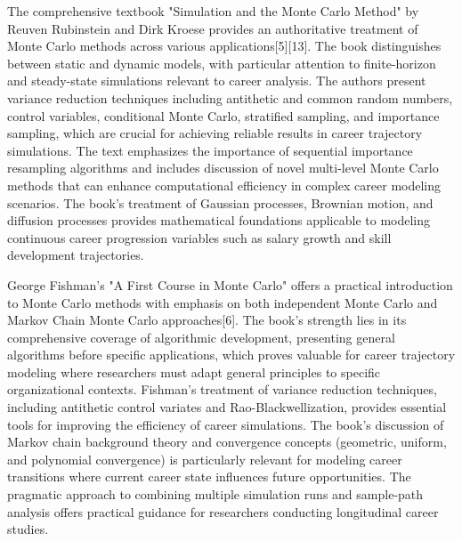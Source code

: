 \documentclass[main.tex]{subfiles}
\begin{document}
The comprehensive textbook "Simulation and the Monte Carlo Method" by Reuven Rubinstein and Dirk Kroese provides an authoritative treatment of Monte Carlo methods across various applications[5][13]. The book distinguishes between static and dynamic models, with particular attention to finite-horizon and steady-state simulations relevant to career analysis. The authors present variance reduction techniques including antithetic and common random numbers, control variables, conditional Monte Carlo, stratified sampling, and importance sampling, which are crucial for achieving reliable results in career trajectory simulations. The text emphasizes the importance of sequential importance resampling algorithms and includes discussion of novel multi-level Monte Carlo methods that can enhance computational efficiency in complex career modeling scenarios. The book's treatment of Gaussian processes, Brownian motion, and diffusion processes provides mathematical foundations applicable to modeling continuous career progression variables such as salary growth and skill development trajectories.


George Fishman's "A First Course in Monte Carlo" offers a practical introduction to Monte Carlo methods with emphasis on both independent Monte Carlo and Markov Chain Monte Carlo approaches[6]. The book's strength lies in its comprehensive coverage of algorithmic development, presenting general algorithms before specific applications, which proves valuable for career trajectory modeling where researchers must adapt general principles to specific organizational contexts. Fishman's treatment of variance reduction techniques, including antithetic control variates and Rao-Blackwellization, provides essential tools for improving the efficiency of career simulations. The book's discussion of Markov chain background theory and convergence concepts (geometric, uniform, and polynomial convergence) is particularly relevant for modeling career transitions where current career state influences future opportunities. The pragmatic approach to combining multiple simulation runs and sample-path analysis offers practical guidance for researchers conducting longitudinal career studies.

\end{document}
